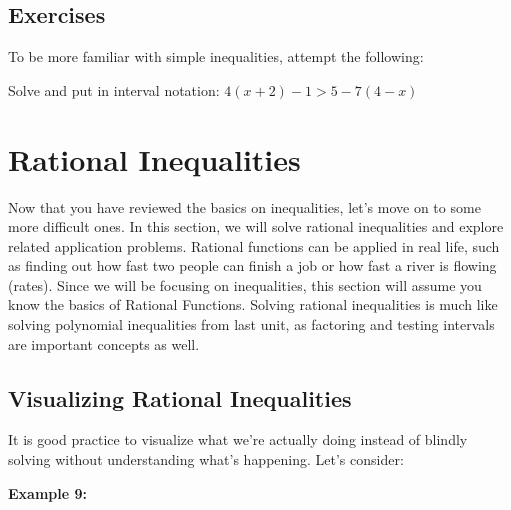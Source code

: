 \documentclass[12pt,fleqn]{book} %
\begin{document}

\section{Exercises}

\small{To be more familiar with simple inequalities, attempt the following:}

\begin{exercise}
Solve and put in interval notation: $4(x+2)-1>5-7(4-x)$
\end{exercise}
\pagebreak



\chapter{Rational Inequalities}

\vspace*{-18mm}

\noindent\normalsize Now that you have reviewed the basics on inequalities, let's move on to some more difficult ones. In this section, we will solve rational inequalities and explore related application problems. Rational functions can be applied in real life, such as finding out how fast two people can finish a job or how fast a river is flowing (rates). Since we will be focusing on inequalities, this section will assume you know the basics of Rational Functions. Solving rational inequalities is much like solving polynomial inequalities from last unit, as factoring and testing intervals are important concepts as well.

\vspace*{-6mm}

\section{Visualizing Rational Inequalities}

It is good practice to visualize what we're actually doing instead of blindly solving without understanding what's happening. Let's consider:

\noindent\textbf{Example 9:}
\end{document}
